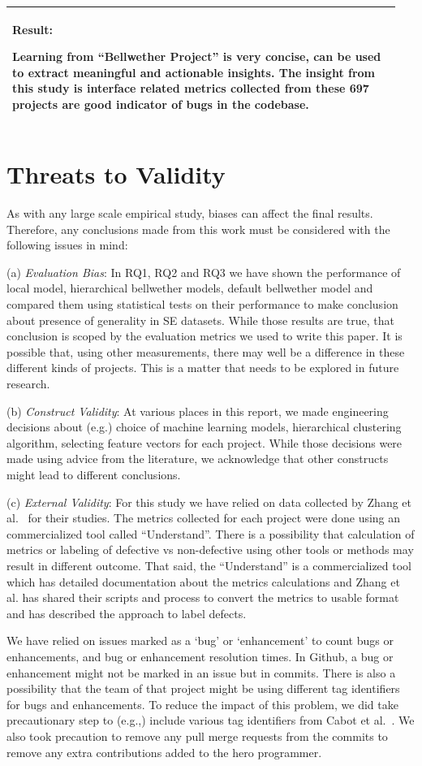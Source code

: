 \documentclass[10pt,journal,compsoc]{IEEEtran}
\newenvironment{result}
{\vspace{0.15cm}
\noindent\begin{minipage}{\linewidth}
\begin{center}
\arrayrulecolor{lightergray}
\begin{tabular}{|p{0.95\linewidth}|}
\hline%
\rowcolor{lightergray}%
\textbf{Result:}~%
}
{\\\hline
\end{tabular}
\end{center}
\end{minipage}
\vspace{0.15cm}
}
\begin{document}
\begin{result}
{Learning from ``Bellwether Project'' is very concise, can be used to extract meaningful and actionable insights. The insight from this study is interface related metrics collected from these 697 projects are good indicator of bugs in the codebase. }
\end{result}


\section{Threats to Validity}
\label{sec:validity}

As with any large scale empirical study, biases can affect the final
results. Therefore, any conclusions made from this work
must be considered with the following issues in mind:

(a) \textit{Evaluation Bias}: 
In  RQ1, RQ2 and RQ3 we have shown the performance of local model, hierarchical bellwether models, default bellwether model and compared them using statistical tests on their performance to make conclusion about presence of generality in SE datasets. While those results are true, that conclusion is scoped by the evaluation metrics we used to write this paper. It is possible that, using other measurements, there may well be a difference in these different kinds of projects. This is a matter that needs to be explored in future research.  

    
(b) \textit{Construct Validity}: At various places in this report, we made engineering decisions about (e.g.) choice of machine learning models, hierarchical clustering algorithm, selecting feature vectors for each project. While those decisions were made using advice from the literature, we acknowledge that other constructs might lead to different conclusions. 

(c) \textit{External Validity}: For this study we have relied on data collected by Zhang et al.~\cite{zhang15} for their studies. The metrics collected for each project were done using an commercialized tool called ``Understand''. There is a possibility that calculation of metrics or labeling of defective vs non-defective using other tools or methods may result in different outcome. That said, the ``Understand'' is a commercialized tool which has detailed documentation about the metrics calculations and Zhang et al. has shared their scripts and process to convert the metrics to usable format and has described the approach to label defects.  

We have relied on issues marked as a `bug' or `enhancement' to count bugs or enhancements, and bug or enhancement resolution times. In Github, a bug or enhancement might not be marked in an issue but in commits. There is also a possibility that the team of that project might be using different tag identifiers for bugs and enhancements. To reduce the impact of this problem, we  did take precautionary step to (e.g.,) include various tag identifiers from Cabot et al.~\cite{cabot2015exploring}. We also took precaution to remove any pull merge requests from the commits to remove any extra contributions added to the hero programmer. 
\end{document}
